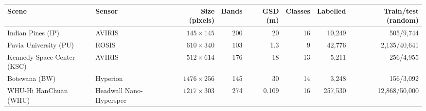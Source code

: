 \begin{tabular}{llrrrrrr}
\toprule
Scene & Sensor & Size (pixels) & Bands & GSD (m) & Classes & Labelled & Train/test (random) \\
\midrule
Indian Pines (IP) & AVIRIS & $145\times145$ & 200 & 20 & 16 & 10,249 & 505/9,744 \\
Pavia University (PU) & ROSIS & $610\times340$ & 103 & 1.3 & 9 & 42,776 & 2,135/40,641 \\
Kennedy Space Center (KSC) & AVIRIS & $512\times614$ & 176 & 18 & 13 & 5,211 & 256/4,955 \\
Botswana (BW) & Hyperion & $1476\times256$ & 145 & 30 & 14 & 3,248 & 156/3,092 \\
WHU-Hi HanChuan (WHU) & Headwall Nano-Hyperspec & $1217\times303$ & 274 & 0.109 & 16 & 257,530 & 12,868/50,000 \\
\bottomrule
\end{tabular}
